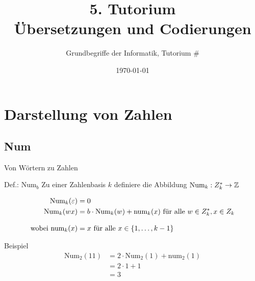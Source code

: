 



\title[Übersetzungen und Codierungen]{5. Tutorium\\ Übersetzungen und Codierungen}
\subtitle{Grundbegriffe der Informatik, Tutorium \#\mytutnumber}
\date{\today}

\usepackage[normalem]{ulem}


\titleframe
\roadmap


\section{Darstellung von Zahlen}

\subsection{Num}
\begin{frame}{Von Wörtern zu Zahlen}
	\begin{block}{Def.: $\text{Num}_b$}
		Zu einer Zahlenbasis $k$ definiere die Abbildung $\text{Num}_k : Z_k^* \to \mathbb{Z}$ 

		\begin{align*}
			\text{Num}_k(\varepsilon) &= 0 \\
			\text{Num}_k(wx) &= b\cdot \text{Num}_k(w) + \text{num}_k(x) \text{ für alle } w\in Z_k^*, x\in Z_k\\[2ex]
			\text{wobei }\text{num}_k(x) &= x \text{ für alle } x \in \left\{ 1,\dots,k-1 \right\}
		\end{align*}
	\end{block}
	\pause
	\begin{exampleblock}{Beispiel}
		\begin{align*}
			\text{Num}_2(11) &= 2\cdot \text{Num}_2(1) + \text{num}_2(1) \\
				&= 2\cdot 1 + 1 \\
				&= 3
		\end{align*}
	\end{exampleblock}
\end{frame}

